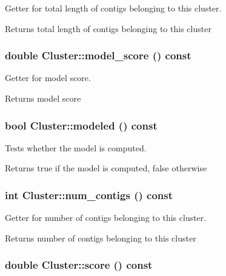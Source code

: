 Getter for total length of contigs belonging to this cluster. \begin{DoxyReturn}{Returns}
total length of contigs belonging to this cluster 
\end{DoxyReturn}
\hypertarget{classCluster_a64bb0635c4d71d1297489aba848a1e9e}{
\subsubsection[{model\_\-score}]{\setlength{\rightskip}{0pt plus 5cm}double Cluster::model\_\-score () const}}
\label{classCluster_a64bb0635c4d71d1297489aba848a1e9e}


Getter for model score. \begin{DoxyReturn}{Returns}
model score 
\end{DoxyReturn}
\hypertarget{classCluster_a0b5712413cedfb5c07fd7eaf31413909}{
\subsubsection[{modeled}]{\setlength{\rightskip}{0pt plus 5cm}bool Cluster::modeled () const}}
\label{classCluster_a0b5712413cedfb5c07fd7eaf31413909}


Tests whether the model is computed. \begin{DoxyReturn}{Returns}
true if the model is computed, false otherwise 
\end{DoxyReturn}
\hypertarget{classCluster_a460d16cd8eca858a6cab9995adea8746}{
\subsubsection[{num\_\-contigs}]{\setlength{\rightskip}{0pt plus 5cm}int Cluster::num\_\-contigs () const}}
\label{classCluster_a460d16cd8eca858a6cab9995adea8746}


Getter for number of contigs belonging to this cluster. \begin{DoxyReturn}{Returns}
number of contigs belonging to this cluster 
\end{DoxyReturn}
\hypertarget{classCluster_aea05b1309029fee923b396518ac1a8f4}{
\subsubsection[{score}]{\setlength{\rightskip}{0pt plus 5cm}double Cluster::score () const}}
\label{classCluster_aea05b1309029fee923b396518ac1a8f4}


